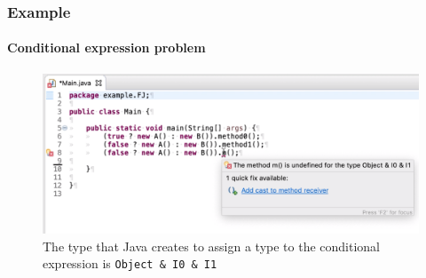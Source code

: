 \documentclass{beamer}
\begin{document}
	\begin{frame}
\frametitle{Example}
\framesubtitle{Conditional expression problem}
\begin{figure}
\centering
\includegraphics[width=1\linewidth]{images/example-intersection-type.png}
\caption{The type that Java creates to assign a type to the conditional expression is \texttt{Object \& I0 \& I1}}
\label{fig:mainres}
\end{figure}
\end{frame}
\end{document}
